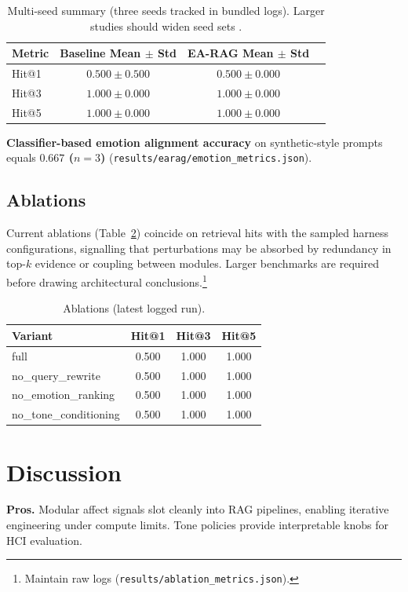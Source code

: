 \documentclass[conference]{IEEEtran}
\begin{document}
\begin{table}[t]
\centering
\begin{tabular}{lccc}
\toprule
Metric & Baseline Mean $\pm$ Std & EA-RAG Mean $\pm$ Std \\
\midrule
Hit@1 & $0.500 \pm 0.500$ & $0.500 \pm 0.000$ \\
Hit@3 & $1.000 \pm 0.000$ & $1.000 \pm 0.000$ \\
Hit@5 & $1.000 \pm 0.000$ & $1.000 \pm 0.000$ \\
\bottomrule
\end{tabular}
\caption{Multi-seed summary (three seeds tracked in bundled logs). Larger studies should widen seed sets \cite{demszky2020goemotions}.}
\label{tab:multiseed}
\end{table}

\textbf{Classifier-based emotion alignment accuracy} on synthetic-style prompts equals \textbf{$0.667$ ($n{=}3$)} (\texttt{results/earag/emotion\_metrics.json}).

\subsection{Ablations}
Current ablations (Table~\ref{tab:abla}) coincide on retrieval hits with the sampled harness configurations, signalling that perturbations may be absorbed by redundancy in top-$k$ evidence or coupling between modules. Larger benchmarks are required before drawing architectural conclusions.\footnote{Maintain raw logs (\texttt{results/ablation\_metrics.json}).}

\begin{table}[t]
\centering
\begin{tabular}{lccc}
\toprule
Variant & Hit@1 & Hit@3 & Hit@5 \\
\midrule
full & 0.500 & 1.000 & 1.000 \\
no\_query\_rewrite & 0.500 & 1.000 & 1.000 \\
no\_emotion\_ranking & 0.500 & 1.000 & 1.000 \\
no\_tone\_conditioning & 0.500 & 1.000 & 1.000 \\
\bottomrule
\end{tabular}
\caption{Ablations (latest logged run).}
\label{tab:abla}
\end{table}

\section{Discussion}
\textbf{Pros.} Modular affect signals slot cleanly into RAG pipelines, enabling iterative engineering under compute limits. Tone policies provide interpretable knobs for HCI evaluation.
\end{document}
